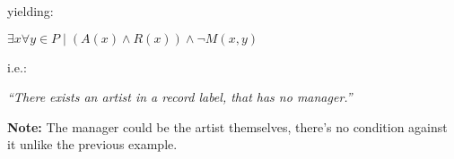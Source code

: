 yielding:

\begin{center}
    \Large
    $\exists x\forall y \in P \mid (A(x)\land R(x)) \land \neg M(x,y)$
\end{center}

i.e.:

\begin{center}
    \Large
    \textit{``There exists an artist in a record label, that has no manager.''}
\end{center}

\begin{Note}
    \textbf{Note:} The manager could be the artist themselves, there's no condition against it unlike the previous example.
\end{Note}

\newpage


